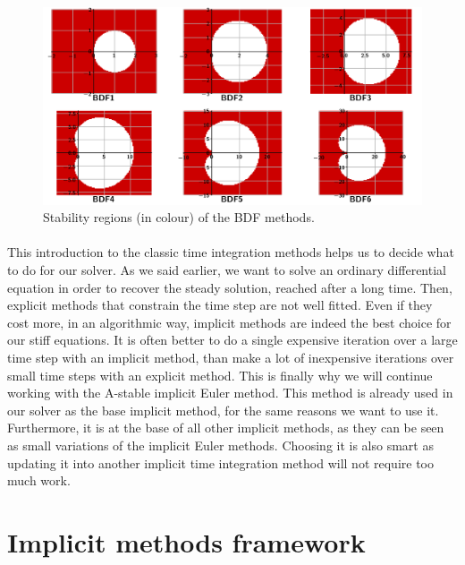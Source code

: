         \begin{figure}
          \centering
          \includegraphics[width=\textwidth]{figures/bdf_stab.png}
          \caption{Stability regions (in colour) of the BDF methods.}
          \label{fig:bdf_stab}
        \end{figure}

      \paragraph{}
      This introduction to the classic time integration methods helps us to decide what to do for our solver.
      As we said earlier, we want to solve an ordinary differential equation in order to recover the steady solution, reached after a long time.
      Then, explicit methods that constrain the time step are not well fitted.
      Even if they cost more, in an algorithmic way, implicit methods are indeed the best choice for our stiff equations.
      It is often better to do a single expensive iteration over a large time step with an implicit method, than make a lot of inexpensive iterations over small time steps with an explicit method.
      This is finally why we will continue working with the A-stable implicit Euler method.
      This method is already used in our solver as the base implicit method, for the same reasons we want to use it.
      Furthermore, it is at the base of all other implicit methods, as they can be seen as small variations of the implicit Euler methods.
      Choosing it is also smart as updating it into another implicit time integration method will not require too much work.


  \section{Implicit methods framework}


